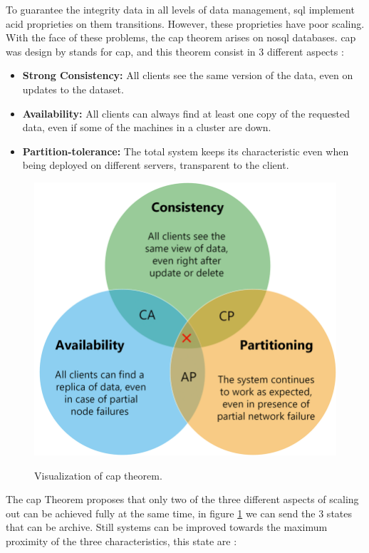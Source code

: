 To guarantee the integrity data in all levels of data management, \gls{sql} implement \gls{acid} proprieties on them transitions. However, these proprieties have poor scaling. With the face of these problems, the \gls{cap} theorem arises on \gls{nosql} databases.
\acrshort{cap} was design by \citeauthor{brewer2000towards}\cite{brewer2000towards} stands for \acrlong{cap}, and this theorem consist in 3 different aspects \cite{nosqlsyed,gilbert2012perspectives}: 
\begin{itemize} 
    \item \textbf{Strong Consistency:} All clients see the same version of the data, even on updates to the dataset.
    \item \textbf{Availability:} All clients can always find at least one copy of the requested data, even if some of the machines in a cluster are down.
    \item \textbf{Partition-tolerance:} The total system keeps its characteristic even when being deployed on different servers, transparent to the client.
\end{itemize}

    \begin{figure}[h!]
    \caption{Visualization of \gls{cap} theorem.}
    \centering
    \includegraphics[width=0.65\columnwidth]{Chapters/images/Visualization-of-CAP-theorem.png}
    \label{fig:cap}
    \end{figure}

The \gls{cap} Theorem proposes that only two of the three different aspects of scaling out can be achieved fully at the same time, in figure \ref{fig:cap} we can send the 3 states that can be archive. Still systems can be improved towards the maximum proximity of the three characteristics, this state are \cite{ericcap12,cattell2011scalable,10.1145/289.291,brewer2000towards}:

